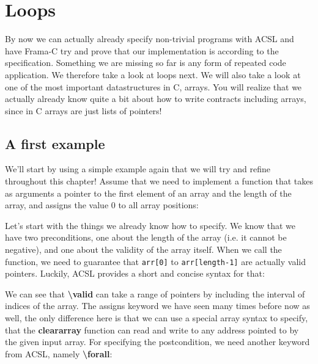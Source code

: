 \chapter{Loops}

By now we can actually already specify non-trivial programs with ACSL and have Frama-C try and prove that our implementation is according to the specification. Something we are missing so far is any form of repeated code application. We therefore take a look at loops next. We will also take a look at one of the most important datastructures in C, arrays. You will realize that we actually already know quite a bit about how to write contracts including arrays, since in C arrays are just lists of pointers! 

\section{A first example}

We'll start by using a simple example again that we will try and refine throughout this chapter! Assume that we need to implement a function that takes as arguments a pointer to the first element of an array and the length of the array, and assigns the value 0 to all array positions: 


Let's start with the things we already know how to specify. We know that we have two preconditions, one about the length of the array (i.e. it cannot be negative), and one about the validity of the array itself. When we call the function, we need to guarantee that \texttt{arr[0]} to \texttt{arr[length-1]} are actually valid pointers. Luckily, ACSL provides a short and concise syntax for that:


We can see that \textbf{\textbackslash valid} can take a range of pointers by including the interval of indices of the array. The assigns keyword we have seen many times before now as well, the only difference here is that we can use a special array syntax to specify, that the \textbf{clear\textunderscore array} function can read and write to any address pointed to by the given input array. For specifying the postcondition, we need another keyword from ACSL, namely \textbf{\textbackslash forall}:


